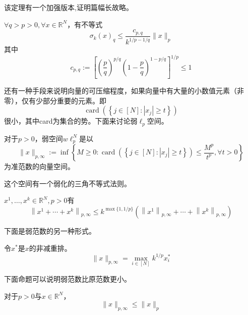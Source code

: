 该定理有一个加强版本,证明篇幅长故略。
\begin{theorem}
    $\forall q>p>0,\forall x\in \mathbb{R}^N$，有不等式
    \begin{equation}
        \sigma_k(x)_q \leq \frac{c_{p, q}}{k^{1 / p-1 / q}}\|x\|_p
    \end{equation}
    其中
    \begin{equation}
        c_{p, q}:=\left[\left(\frac{p}{q}\right)^{p / q}\left(1-\frac{p}{q}\right)^{1-p / q}\right]^{1 / p} \leq 1
    \end{equation}
\end{theorem}
还有一种手段来说明向量的可压缩程度，如果向量中有大量的小数值元素（非零），仅有少部分重要的元素。即
\begin{equation*}
    \operatorname{card}\left(\left\{j \in[N]:\left|x_j\right| \geq t\right\}\right)
\end{equation*}
很小，其中card为集合的势。下面来讨论弱$\ell_p$空间。
\begin{definition}
    对于$p>0$，弱空间$w \ell_p^N$是以
    \begin{equation}
        \|x\|_{p, \infty}:=\inf \left\{M \geq 0: \operatorname{card}\left(\left\{j \in[N]:\left|x_j\right| \geq t\right\}\right) \leq \frac{M^p}{t^p} ,\forall t>0\right\}
    \end{equation}
    为准范数的向量空间。
\end{definition}
这个空间有一个弱化的三角不等式法则。
\begin{proposition}
    $x^1, \ldots, x^k \in \mathbb{R}^N,p>0$有
    \begin{equation}
        \left\|x^1+\cdots+x^k\right\|_{p, \infty} \leq k^{\max \{1,1 / p\}}\left(\left\|x^1\right\|_{p, \infty}+\cdots+\left\|x^k\right\|_{p, \infty}\right)
    \end{equation}
\end{proposition}
下面是弱范数的另一种形式。
\begin{proposition}
令$x^*$是$x$的非减重排。
    \begin{equation}
        \|x\|_{p, \infty}=\max _{i \in[N]} k^{1 / p} x_i^*
    \end{equation}
\end{proposition}
下面命题可以说明弱范数比原范数更小。
\begin{proposition}
    对于$p>0$与$x\in \mathbb{R}^N$，
    \begin{equation}
        \|x\|_{p, \infty} \leq\|x\|_p
    \end{equation}
\end{proposition}
